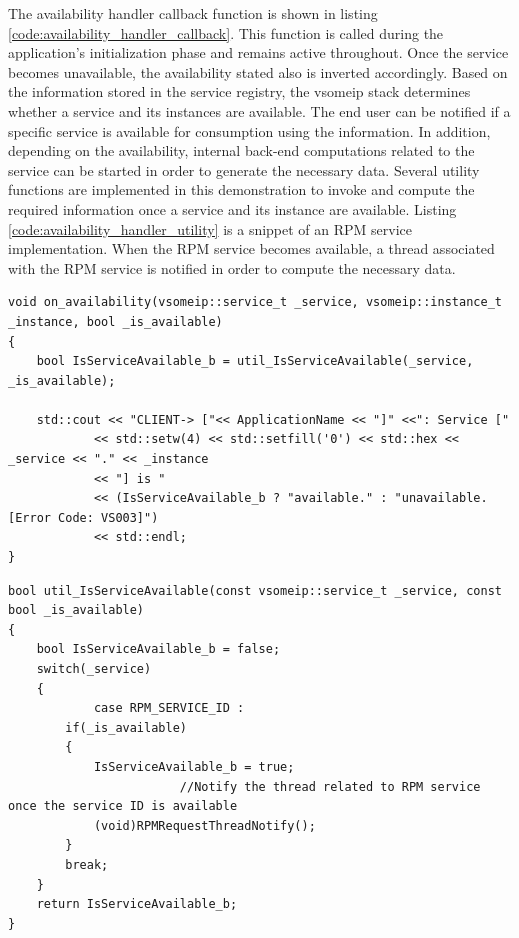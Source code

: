 The availability handler callback function is shown in listing \ref{code:availability_handler_callback}. This function is called during the application's initialization phase and remains active throughout. Once the service becomes unavailable, the availability stated also is inverted accordingly. Based on the information stored in the service registry, the vsomeip stack determines whether a service and its instances are available. The end user can be notified if a specific service is available for consumption using the information. In addition, depending on the availability, internal back-end computations related to the service can be started in order to generate the necessary data. Several utility functions are implemented in this demonstration to invoke and compute the required information once a service and its instance are available. Listing \ref{code:availability_handler_utility} is a snippet of an RPM service implementation. When the RPM service becomes available, a thread associated with the RPM service is notified in order to compute the necessary data.
 
\begin{lstlisting}[caption={vsomeip availability handler callback function}, label=code:availability_handler_callback]
void on_availability(vsomeip::service_t _service, vsomeip::instance_t _instance, bool _is_available)
{
    bool IsServiceAvailable_b = util_IsServiceAvailable(_service, _is_available);

    std::cout << "CLIENT-> ["<< ApplicationName << "]" <<": Service ["
            << std::setw(4) << std::setfill('0') << std::hex << _service << "." << _instance
            << "] is "
            << (IsServiceAvailable_b ? "available." : "unavailable. [Error Code: VS003]")
            << std::endl;
}
\end{lstlisting}

\begin{lstlisting}[caption={availability handler utility function}, label=code:availability_handler_utility]
bool util_IsServiceAvailable(const vsomeip::service_t _service, const bool _is_available)
{
    bool IsServiceAvailable_b = false;
    switch(_service)
    {
			case RPM_SERVICE_ID :
        if(_is_available)
        {
            IsServiceAvailable_b = true;
						//Notify the thread related to RPM service once the service ID is available
            (void)RPMRequestThreadNotify();
        }
        break;
    }
    return IsServiceAvailable_b;
}
\end{lstlisting}

